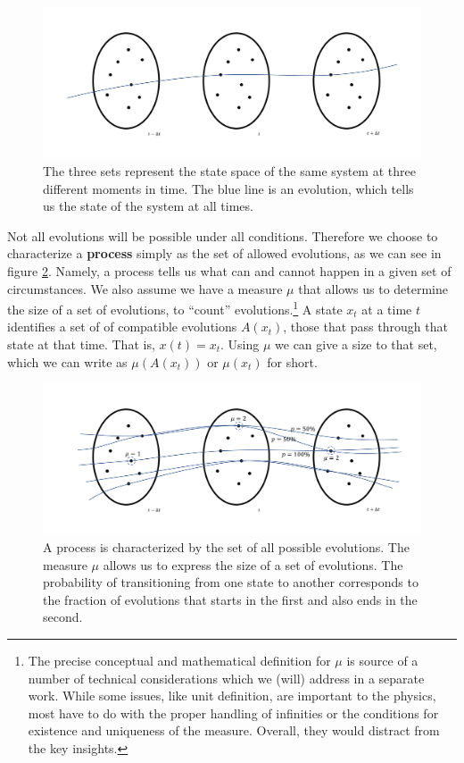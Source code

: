 \documentclass[letterpaper,twocolumn]{article}
\begin{document}
\begin{figure}[h]
	\includegraphics[width=\columnwidth]{images/Slide1.png}
	\caption{The three sets represent the state space of the same system at three different moments in time. The blue line is an evolution, which tells us the state of the system at all times.}\label{fig_single_evolution}
\end{figure}

Not all evolutions will be possible under all conditions. Therefore we choose to characterize a \textbf{process} simply as the set of allowed evolutions, as we can see in figure \ref{fig_process}. Namely, a process tells us what can and cannot happen in a given set of circumstances. We also assume we have a measure $\mu$ that allows us to determine the size of a set of evolutions, to ``count'' evolutions.\footnote{The precise conceptual and mathematical definition for $\mu$ is source of a number of technical considerations which we (will) address in a separate work. While some issues, like unit definition, are important to the physics, most have to do with the proper handling of infinities or the conditions for existence and uniqueness of the measure. Overall, they would distract from the key insights.} A state $x_t$ at a time $t$ identifies a set of of compatible evolutions $A(x_t)$, those that pass through that state at that time. That is, $x(t) = x_t$. Using $\mu$ we can give a size to that set, which we can write as $\mu(A(x_t))$ or $\mu(x_t)$ for short.

\begin{figure}[h]
	\includegraphics[width=\columnwidth]{images/Slide2.png}
	\caption{A process is characterized by the set of all possible evolutions. The measure $\mu$ allows us to express the size of a set of evolutions. The probability of transitioning from one state to another corresponds to the fraction of evolutions that starts in the first and also ends in the second.}\label{fig_process}
\end{figure}
\end{document}
